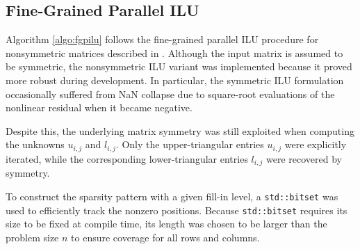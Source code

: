 \subsection{Fine-Grained Parallel ILU}
\label{sec:fine-grain-parall-1}

Algorithm \ref{algo:fgpilu} follows the fine-grained parallel ILU procedure for
nonsymmetric matrices described in \cite{chow_fine-grained_2015}. Although the
input matrix is assumed to be symmetric, the nonsymmetric ILU variant was
implemented because it proved more robust during development. In particular, the
symmetric ILU formulation occasionally suffered from NaN collapse due to
square-root evaluations of the nonlinear residual when it became negative.

Despite this, the underlying matrix symmetry was still exploited when computing
the unknowns \(u_{i,j}\) and \(l_{i,j}\). Only the upper-triangular entries
\(u_{i,j}\) were explicitly iterated, while the corresponding lower-triangular
entries \(l_{i,j}\) were recovered by symmetry.

To construct the sparsity pattern with a given fill-in level, a
\texttt{std::bitset} was used to efficiently track the nonzero positions.
Because \texttt{std::bitset} requires its size to be fixed at compile time, its
length was chosen to be larger than the problem size \(n\) to ensure coverage
for all rows and columns.

